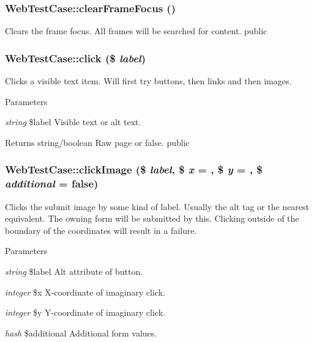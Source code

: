 \hypertarget{class_web_test_case_ae38524c59375b3e28ad37b35be923b1d}{
\subsubsection[{clearFrameFocus}]{\setlength{\rightskip}{0pt plus 5cm}WebTestCase::clearFrameFocus ()}}
\label{class_web_test_case_ae38524c59375b3e28ad37b35be923b1d}
Clears the frame focus. All frames will be searched for content.  public \hypertarget{class_web_test_case_a55d9b7671e27cb63d19107722628bd8e}{
\subsubsection[{click}]{\setlength{\rightskip}{0pt plus 5cm}WebTestCase::click (\$ {\em label})}}
\label{class_web_test_case_a55d9b7671e27cb63d19107722628bd8e}
Clicks a visible text item. Will first try buttons, then links and then images. 
\begin{DoxyParams}{Parameters}
\item[{\em string}]\$label Visible text or alt text. \end{DoxyParams}
\begin{DoxyReturn}{Returns}
string/boolean Raw page or false.  public 
\end{DoxyReturn}
\hypertarget{class_web_test_case_a235d36a855726467258fd896f724f1c9}{
\subsubsection[{clickImage}]{\setlength{\rightskip}{0pt plus 5cm}WebTestCase::clickImage (\$ {\em label}, \/  \$ {\em x} = {}, \/  \$ {\em y} = {}, \/  \$ {\em additional} = {\ttfamily false})}}
\label{class_web_test_case_a235d36a855726467258fd896f724f1c9}
Clicks the submit image by some kind of label. Usually the alt tag or the nearest equivalent. The owning form will be submitted by this. Clicking outside of the boundary of the coordinates will result in a failure. 
\begin{DoxyParams}{Parameters}
\item[{\em string}]\$label Alt attribute of button. \item[{\em integer}]\$x X-\/coordinate of imaginary click. \item[{\em integer}]\$y Y-\/coordinate of imaginary click. \item[{\em hash}]\$additional Additional form values. \end{DoxyParams}
